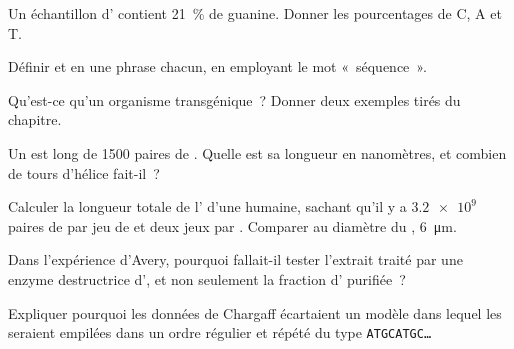 \begin{exercise}[$\star$]\label{exo:g10:universal-dna:3}
Un échantillon d' contient 21~\% de guanine. Donner les pourcentages
de C, A et T.
\end{exercise}

\begin{exercise}[$\star$]\label{exo:g10:universal-dna:4}
Définir  et  en une phrase chacun, en employant le mot
«~séquence~».
\end{exercise}

\begin{exercise}[$\star$]\label{exo:g10:universal-dna:5}
Qu'est-ce qu'un organisme transgénique~? Donner deux exemples tirés du
chapitre.
\end{exercise}

\begin{exercise}[$\star\star$]\label{exo:g10:universal-dna:6}
Un  est long de 1500 paires de . Quelle est sa longueur en
nanomètres, et combien de tours d'hélice fait-il~?
\end{exercise}

\begin{exercise}[$\star\star$]\label{exo:g10:universal-dna:7}
Calculer la longueur totale de l' d'une  humaine, sachant
qu'il y a $\num{3.2e9}$ paires de  par jeu de  et deux
jeux par . Comparer au diamètre du , \qty{6}{\micro m}.
\end{exercise}

\begin{exercise}[$\star\star$]\label{exo:g10:universal-dna:8}
Dans l'expérience d'Avery, pourquoi fallait-il tester l'extrait traité
par une enzyme destructrice d', et non seulement la fraction d'
purifiée~?
\end{exercise}

\begin{exercise}[$\star\star$]\label{exo:g10:universal-dna:9}
Expliquer pourquoi les données de Chargaff écartaient un modèle dans
lequel les  seraient empilées dans un ordre régulier et répété du
type \texttt{ATGCATGC\dots}
\end{exercise}

